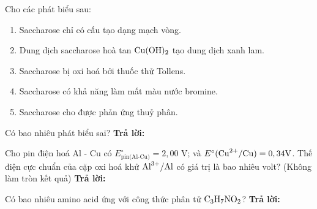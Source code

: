 \documentclass[11pt,a4paper]{article}
\begin{document}
\begin{ex}
Cho các phát biểu sau:
\begin{enumerate}[label=(\alph*),leftmargin=20pt,itemsep=1pt]
\item Saccharose chỉ có cấu tạo dạng mạch vòng.
\item Dung dịch saccharose hoà tan $\ce{Cu(OH)2}$ tạo dung dịch xanh lam.
\item Saccharose bị oxi hoá bởi thuốc thử Tollens.
\item Saccharose có khả năng làm mất màu nước bromine.
\item Saccharose cho được phản ứng thuỷ phân.
\end{enumerate}
Có bao nhiêu phát biểu sai?
\hfill \textbf{Trả lời:} \dotfill

\end{ex}
\begin{ex}
Cho pin điện hoá Al - Cu có $E^\circ_\text{pin(Al-Cu)} = 2,00\text{ V}$; và $E^\circ(\ce{Cu^2+}/\ce{Cu}) = 0,34\text{V}$. Thế điện cực chuẩn của cặp oxi hoá khử $\ce{Al^3+}/\ce{Al}$ có giá trị là bao nhiêu volt? (Không làm tròn kết quả)
\hfill \textbf{Trả lời:} \dotfill

\end{ex}
\begin{ex}
Có bao nhiêu amino acid ứng với công thức phân tử $\ce{C3H7NO2}$?
\hfill \textbf{Trả lời:} \dotfill

\end{ex}
\end{document}
